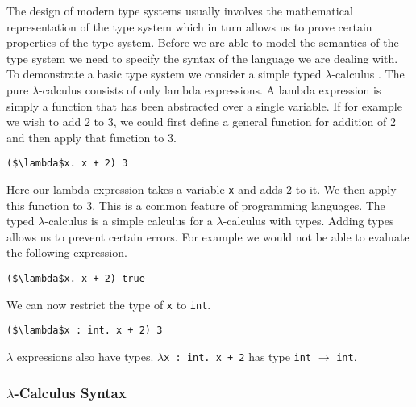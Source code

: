 \documentclass[11pt
              , a4paper
              , twoside
              , openright
              ]{report}
\numberwithin{case}{theorem}
\numberwithin{subcase}{case}
\begin{document}
The design of modern type systems usually involves the mathematical representation of the type system which in turn allows us to prove certain properties of the type system. Before we are able to model the semantics of the type system we need to specify the syntax of the language we are dealing with. To demonstrate a basic type system we consider a simple typed $\lambda$-calculus \cite{church1940formulation, curry1959combinatory, Pierce:2002:TPL:509043}. The pure $\lambda$-calculus consists of only lambda expressions. A lambda expression is simply a function that has been abstracted over a single variable. If for example we wish to add 2 to 3, we could first define a general function for addition of 2 and then apply that function to 3.
\begin{lstlisting}[mathescape, style=custom_lang]
($\lambda$x. x + 2) 3
\end{lstlisting}
Here our lambda expression takes a variable \verb|x| and adds 2 to it. We then apply this function to 3. This is a common feature of programming languages. The typed $\lambda$-calculus is a simple calculus for a $\lambda$-calculus with types. Adding types allows us to prevent certain errors. For example we would not be able to evaluate the following expression.
\begin{lstlisting}[mathescape, style=custom_lang]
($\lambda$x. x + 2) true
\end{lstlisting}
We can now restrict the type of \verb|x| to \verb|int|.
\begin{lstlisting}[mathescape, style=custom_lang]
($\lambda$x : int. x + 2) 3
\end{lstlisting}
$\lambda$ expressions also have types. $\lambda$\verb|x : int. x + 2| has type \verb|int| $\rightarrow$ \verb|int|. 
\subsubsection{$\lambda$-Calculus Syntax}
\end{document}
